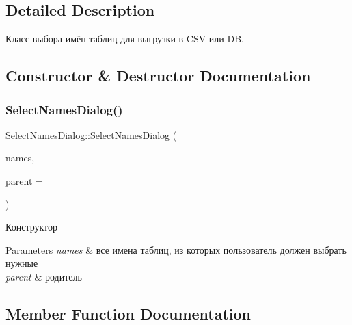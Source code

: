 \subsection{Detailed Description}
Класс выбора имён таблиц для выгрузки в C\+SV или DB. 

\subsection{Constructor \& Destructor Documentation}
\mbox{\label{class_select_names_dialog_af5d6957152caad6629fe390127f8fe90}} 
\subsubsection{\texorpdfstring{Select\+Names\+Dialog()}{SelectNamesDialog()}}
{\footnotesize\ttfamily Select\+Names\+Dialog\+::\+Select\+Names\+Dialog (\begin{DoxyParamCaption}\item[{const Q\+String\+List \&}]{names,  }\item[{Q\+Widget $\ast$}]{parent = {} }\end{DoxyParamCaption})\hspace{0.3cm}{\ttfamily [explicit]}}



Конструктор 


\begin{DoxyParams}{Parameters}
{\em names} & все имена таблиц, из которых пользователь должен выбрать нужные \\
\hline
{\em parent} & родитель \\
\hline
\end{DoxyParams}


\subsection{Member Function Documentation}
\mbox{\label{class_select_names_dialog_a063b06a2ee6f46d0aa2ae5399d18ff04}} 
